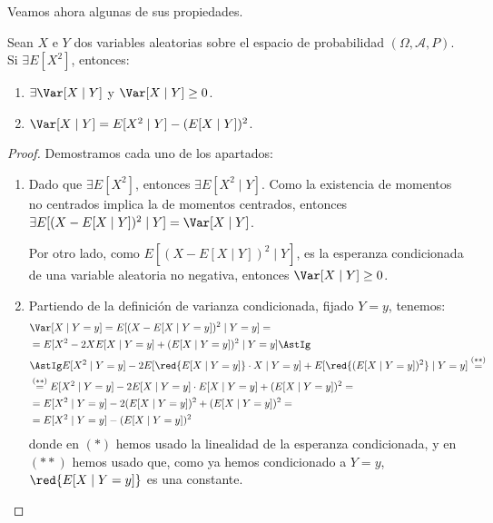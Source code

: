 Veamos ahora algunas de sus propiedades.
\begin{prop}
    Sean $X$ e $Y$ dos variables aleatorias sobre el espacio de probabilidad $(\Omega, \mathcal{A}, P)$. Si $\exists E[X^2]$, entonces:
    \begin{enumerate}
        \item $\exists \Var[X\mid Y]$ y $\Var[X\mid Y] \geq 0$.
        \item $\Var[X\mid Y] = E[X^2\mid Y] - (E[X\mid Y])^2$.
    \end{enumerate}
\end{prop}
\begin{proof}
    Demostramos cada uno de los apartados:
    \begin{enumerate}
        \item Dado que $\exists E[X^2]$, entonces $\exists E[X^2\mid Y]$. Como la existencia de momentos no centrados implica la de momentos centrados, entonces $\exists E[(X - E[X\mid Y])^2\mid Y] = \Var[X\mid Y]$.
        
        Por otro lado, como $E[(X - E[X\mid Y])^2\mid Y]$, es la esperanza condicionada de una variable aleatoria no negativa, entonces $\Var[X\mid Y] \geq 0$.

        \item Partiendo de la definición de varianza condicionada, fijado $Y = y$, tenemos:
        \begin{align*}
            &\Var[X\mid Y=y] = E[(X - E[X\mid Y = y])^2\mid Y = y]
            =\\&= E[X^2 - 2XE[X\mid Y = y] + (E[X\mid Y = y])^2\mid Y = y]
            \AstIg\\&\AstIg E[X^2\mid Y = y] - 2E[\red{E[X\mid Y = y]}\cdot X\mid Y=y] + E[\red{(E[X\mid Y = y])^2}\mid Y = y]
            \stackrel{(\ast\ast)}{=}\\&\stackrel{(\ast\ast)}{=} E[X^2\mid Y = y] - 2E[X\mid Y = y]\cdot E[X\mid Y=y] + (E[X\mid Y = y])^2
            =\\&= E[X^2\mid Y = y] - 2(E[X\mid Y = y])^2 + (E[X\mid Y = y])^2
            =\\&= E[X^2\mid Y = y] - (E[X\mid Y = y])^2
        \end{align*}
        donde en $(\ast)$ hemos usado la linealidad de la esperanza condicionada, y en $(\ast\ast)$ hemos usado que, como ya hemos condicionado a $Y=y$, $\red{E[X\mid Y = y]}$ es una constante.
    \end{enumerate}
\end{proof}

